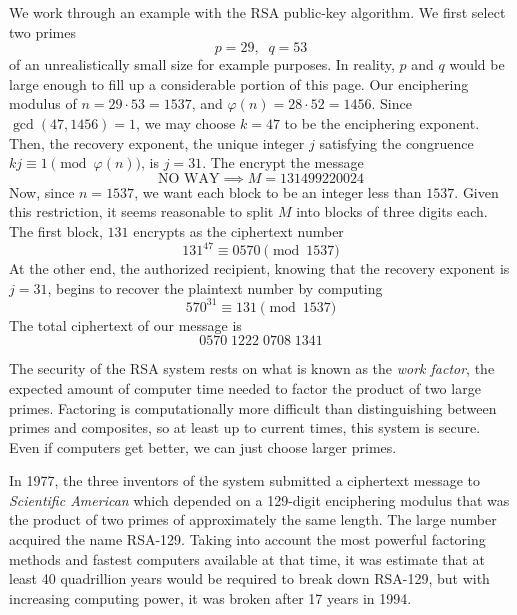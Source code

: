 \documentclass{article}
\newcounter{example}[section]
\begin{document}
We work through an example with the RSA public-key algorithm. We first select two primes 
\begin{equation}
  p = 29, \;\; q = 53
\end{equation}
of an unrealistically small size for example purposes. In reality, $p$ and $q$ would be large enough to fill up a considerable portion of this page. Our enciphering modulus of $n = 29 \cdot 53 = 1537$, and $\varphi(n) = 28 \cdot 52 = 1456$. Since $\gcd(47, 1456) = 1$, we may choose $k = 47$ to be the enciphering exponent. Then, the recovery exponent, the unique integer $j$ satisfying the congruence $kj \equiv 1 \pmod{\varphi(n)}$, is $j = 31$. The encrypt the message 
\begin{equation}
  \text{NO WAY} \implies M = 131499220024
\end{equation}
Now, since $n = 1537$, we want each block to be an integer less than $1537$. Given this restriction, it seems reasonable to split $M$ into blocks of three digits each. The first block, $131$ encrypts as the ciphertext number 
\begin{equation}
  131^{47} \equiv 0570 \pmod{1537}
\end{equation}
At the other end, the authorized recipient, knowing that the recovery exponent is $j = 31$, begins to recover the plaintext number by computing 
\begin{equation}
  570^{31} \equiv 131 \pmod{1537}
\end{equation}
The total ciphertext of our message is 
\begin{equation}
  0570 \; 1222 \; 0708 \; 1341
\end{equation}

The security of the RSA system rests on what is known as the \textit{work factor}, the expected amount of computer time needed to factor the product of two large primes. Factoring is computationally more difficult than distinguishing between primes and composites, so at least up to current times, this system is secure. Even if computers get better, we can just choose larger primes. 

In 1977, the three inventors of the system submitted a ciphertext message to \textit{Scientific American} which depended on a 129-digit enciphering modulus that was the product of two primes of approximately the same length. The large number acquired the name RSA-129. Taking into account the most powerful factoring methods and fastest computers available at that time, it was estimate that at least 40 quadrillion years would be required to break down RSA-129, but with increasing computing power, it was broken after 17 years in 1994. 
\end{document}
